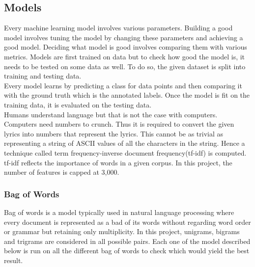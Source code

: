 \documentclass[11pt,a4paper]{article}
\begin{document}
\subsection{Models}
\label{models}
Every machine learning model involves various parameters. Building a good model involves tuning the model by changing these parameters and achieving a good model. Deciding what model is good involves comparing them with various metrics. Models are first trained on data but to check how good the model is, it needs to be tested on some data as well. To do so, the given dataset is split into training and testing data.\\
Every model learns by predicting a class for data points and then comparing it with the ground truth which is the annotated labels. Once the model is fit on the training data, it is evaluated on the testing data.\\ 
Humans understand language but that is not the case with computers. Computers need numbers to crunch. Thus it is required to convert the given lyrics into numbers that represent the lyrics. This cannot be as trivial as representing a string of ASCII values of all the characters in the string. Hence a technique called term frequency-inverse document frequency(tf-idf) is computed. tf-idf reflects the importance of words in a given corpus. In this project, the number of features is capped at 3,000.\\

\subsubsection{Bag of Words}
\label{bow}
Bag of words is a model typically used in natural language processing where every document is represented as a bad of its words without regarding word order or grammar but retaining only multiplicity. In this project, unigrams, bigrams and trigrams are considered in all possible pairs. Each one of the model described below is run on all the different bag of words to check which would yield the best result.
\end{document}

